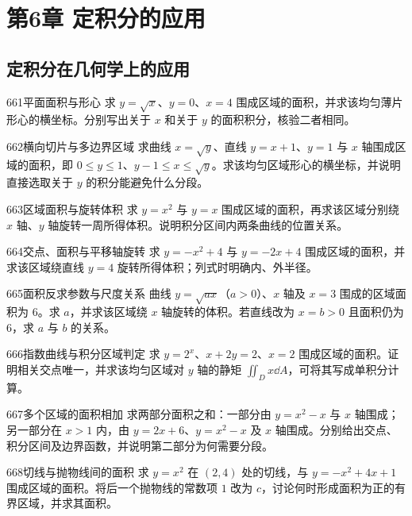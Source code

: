 \section{第6章 定积分的应用}
\subsection{定积分在几何学上的应用}
\begin{exercise}{661}{平面面积与形心}
求 $y=\sqrt x$、$y=0$、$x=4$ 围成区域的面积，并求该均匀薄片形心的横坐标。分别写出关于 $x$ 和关于 $y$ 的面积积分，核验二者相同。
\end{exercise}
\begin{exercise}{662}{横向切片与多边界区域}
求曲线 $x=\sqrt y$、直线 $y=x+1$、$y=1$ 与 $x$ 轴围成区域的面积，即 $0\le y\le1$、$y-1\le x\le\sqrt y$。求该均匀区域形心的横坐标，并说明直接选取关于 $y$ 的积分能避免什么分段。
\end{exercise}
\begin{exercise}{663}{区域面积与旋转体积}
求 $y=x^2$ 与 $y=x$ 围成区域的面积，再求该区域分别绕 $x$ 轴、$y$ 轴旋转一周所得体积。说明积分区间内两条曲线的位置关系。
\end{exercise}
\begin{exercise}{664}{交点、面积与平移轴旋转}
求 $y=-x^2+4$ 与 $y=-2x+4$ 围成区域的面积，并求该区域绕直线 $y=4$ 旋转所得体积；列式时明确内、外半径。
\end{exercise}
\begin{exercise}{665}{面积反求参数与尺度关系}
曲线 $y=\sqrt{ax}$（$a>0$）、$x$ 轴及 $x=3$ 围成的区域面积为 $6$。求 $a$，并求该区域绕 $x$ 轴旋转的体积。若直线改为 $x=b>0$ 且面积仍为 $6$，求 $a$ 与 $b$ 的关系。
\end{exercise}
\begin{exercise}{666}{指数曲线与积分区域判定}
求 $y=2^x$、$x+2y=2$、$x=2$ 围成区域的面积。证明相关交点唯一，并求该均匀区域对 $y$ 轴的静矩 $\iint_Dx\dd A$，可将其写成单积分计算。
\end{exercise}
\begin{exercise}{667}{多个区域的面积相加}
求两部分面积之和：一部分由 $y=x^2-x$ 与 $x$ 轴围成；另一部分在 $x>1$ 内，由 $y=2x+6$、$y=x^2-x$ 及 $x$ 轴围成。分别给出交点、积分区间及边界函数，并说明第二部分为何需要分段。
\end{exercise}
\begin{exercise}{668}{切线与抛物线间的面积}
求 $y=x^2$ 在 $(2,4)$ 处的切线，与 $y=-x^2+4x+1$ 围成区域的面积。将后一个抛物线的常数项 $1$ 改为 $c$，讨论何时形成面积为正的有界区域，并求其面积。
\end{exercise}
